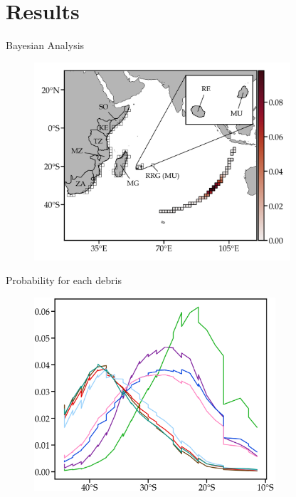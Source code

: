 \documentclass{beamer}
\begin{document}
\section{Results}

\begin{frame}{Bayesian Analysis}  

\begin{figure}[hbt]
  \includegraphics[width=0.85\textwidth]{figures/mh370-fig03.png}
\end{figure}

\end{frame}

\begin{frame}{Probability for each debris}  

\begin{figure}[hbt]
  \includegraphics[width=0.8\textwidth]{figures/mh370-fig04.png}
\end{figure}

\end{frame}
\end{document}
